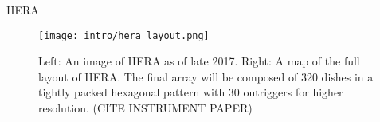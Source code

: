 HERA \cite{2017PASP..129d5001D}

\begin{figure}[ht]
	\centering
	\texttt{[image: intro/hera\_layout.png]}
	\caption[Layout of HERA]{Left: An image of HERA as of late 2017. Right: A map of
					 the full layout of HERA. The final array will be composed of 320 dishes
					 in a tightly packed hexagonal pattern with 30 outriggers for higher resolution. (CITE INSTRUMENT PAPER)}
	\label{fig:hera_layout}
\end{figure}
